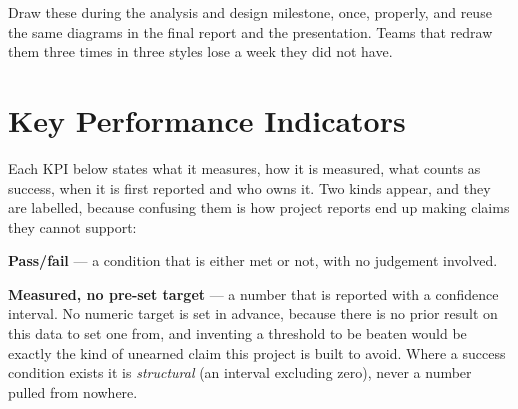 \documentclass[11pt,a4paper]{article}
\begin{document}
\begin{goodbox}
Draw these during the analysis and design milestone, once, properly, and reuse the same diagrams in
the final report and the presentation. Teams that redraw them three times in three styles lose a
week they did not have.
\end{goodbox}
\section{Key Performance Indicators}
\label{sec:kpis}

\begin{keybox}
Each KPI below states what it measures, how it is measured, what counts as success, when it is first
reported and who owns it. Two kinds appear, and they are labelled, because confusing them is how
project reports end up making claims they cannot support:

\textbf{Pass/fail} --- a condition that is either met or not, with no judgement involved.

\textbf{Measured, no pre-set target} --- a number that is reported with a confidence interval. No
numeric target is set in advance, because there is no prior result on this data to set one from, and
inventing a threshold to be beaten would be exactly the kind of unearned claim this project is built
to avoid. Where a success condition exists it is \emph{structural} (an interval excluding zero),
never a number pulled from nowhere.
\end{keybox}
\end{document}

